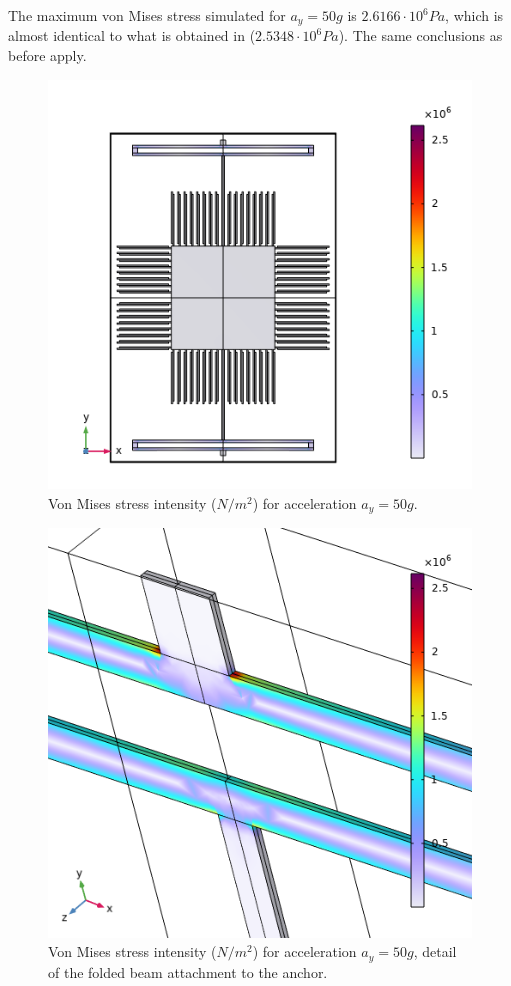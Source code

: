 \documentclass[lettersize,journal]{IEEEtran}
\begin{document}
    The maximum von Mises stress simulated for \(a_y=50g\) is \(2.6166\cdot10^6Pa\), which is almost identical to what is obtained in \cite{original} (\(2.5348\cdot10^6Pa\)). The same conclusions as before apply.
    
    \begin{figure}[!h]
        \centering
        \includegraphics[width=1.0\linewidth]{stress_ay}
        \caption{Von Mises stress intensity (\(N/m^2\)) for acceleration \(a_y=50g\).}
        \label{fig:stress_ay}
    \end{figure}
    
    \begin{figure}[!h]
        \centering
        \includegraphics[width=1.0\linewidth]{stress_ay_detail}
        \caption{Von Mises stress intensity (\(N/m^2\)) for acceleration \(a_y=50g\), detail of the folded beam attachment to the anchor.}
        \label{fig:stress_ay_det}
    \end{figure}
    
\end{document}
